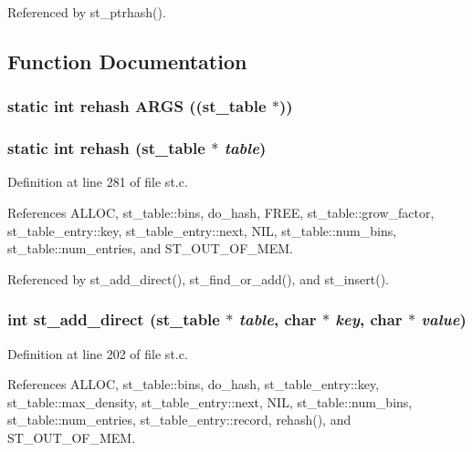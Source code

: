 Referenced by st\_\-ptrhash().

\subsection{Function Documentation}
\subsubsection{\setlength{\rightskip}{0pt plus 5cm}static int rehash ARGS ((\bf{st\_\-table} $\ast$))\hspace{0.3cm}{\tt  [static]}}\label{st_8c_9258aa29260061322fd1f5fa1e5c4172}


\subsubsection{\setlength{\rightskip}{0pt plus 5cm}static int rehash (\bf{st\_\-table} $\ast$ {\em table})\hspace{0.3cm}{\tt  [static]}}\label{st_8c_974179f1640bb047e2c46bdafe2b2fb0}




Definition at line 281 of file st.c.

References ALLOC, st\_\-table::bins, do\_\-hash, FREE, st\_\-table::grow\_\-factor, st\_\-table\_\-entry::key, st\_\-table\_\-entry::next, NIL, st\_\-table::num\_\-bins, st\_\-table::num\_\-entries, and ST\_\-OUT\_\-OF\_\-MEM.

Referenced by st\_\-add\_\-direct(), st\_\-find\_\-or\_\-add(), and st\_\-insert().
\subsubsection{\setlength{\rightskip}{0pt plus 5cm}int st\_\-add\_\-direct (\bf{st\_\-table} $\ast$ {\em table}, char $\ast$ {\em key}, char $\ast$ {\em value})}\label{st_8c_23181b3571fdb45f4ff4b5ffad656f5c}




Definition at line 202 of file st.c.

References ALLOC, st\_\-table::bins, do\_\-hash, st\_\-table\_\-entry::key, st\_\-table::max\_\-density, st\_\-table\_\-entry::next, NIL, st\_\-table::num\_\-bins, st\_\-table::num\_\-entries, st\_\-table\_\-entry::record, rehash(), and ST\_\-OUT\_\-OF\_\-MEM.

